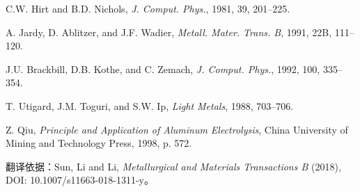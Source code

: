 \documentclass[UTF8,zihao=-4,fontset=fandol]{ctexart}
\begin{document}
\begin{enumerate}[label={[\arabic*]},leftmargin=2.8em,itemsep=0.15em]
\item C.W. Hirt and B.D. Nichols, \emph{J. Comput. Phys.}, 1981, 39, 201--225.
\item A. Jardy, D. Ablitzer, and J.F. Wadier, \emph{Metall. Mater. Trans. B}, 1991, 22B, 111--120.
\item J.U. Brackbill, D.B. Kothe, and C. Zemach, \emph{J. Comput. Phys.}, 1992, 100, 335--354.
\item T. Utigard, J.M. Toguri, and S.W. Ip, \emph{Light Metals}, 1988, 703--706.
\item Z. Qiu, \emph{Principle and Application of Aluminum Electrolysis}, China University of Mining and Technology Press, 1998, p. 572.
\end{enumerate}

\vfill
\begin{center}\footnotesize 翻译依据：Sun, Li and Li, \emph{Metallurgical and Materials Transactions B} (2018), DOI: 10.1007/s11663-018-1311-y。\end{center}
\end{document}
